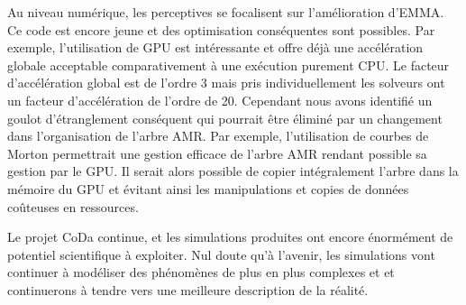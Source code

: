 Au niveau numérique, les perceptives se focalisent sur l'amélioration d'EMMA. 
Ce code est encore jeune et des optimisation conséquentes sont possibles.
Par exemple, l'utilisation de \ac{GPU} est intéressante et offre déjà une accélération globale acceptable comparativement à une exécution purement \ac{CPU}.
Le facteur d'accélération global est de l'ordre 3 mais pris individuellement les solveurs ont un facteur d'accélération de l'ordre de 20.
Cependant nous avons identifié un goulot d'étranglement conséquent qui pourrait être éliminé par un changement dans l'organisation de l'arbre \ac{AMR}.
Par exemple, l'utilisation de courbes de Morton permettrait une gestion efficace de l'arbre \ac{AMR} rendant possible sa gestion par le \ac{GPU}.
Il serait alors possible de copier intégralement l'arbre dans la mémoire du \ac{GPU} et évitant ainsi les manipulations et copies de données coûteuses en ressources.

Le projet \ac{CoDa} continue, et les simulations produites ont encore énormément de potentiel scientifique à exploiter.
Nul doute qu'à l'avenir, les simulations vont continuer à modéliser des phénomènes de plus en plus complexes et et continuerons à tendre vers une meilleure description de la réalité.







%



